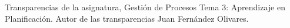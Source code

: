 % 

\begin{thebibliography}{99}

\emph{}Transparencias de la asignatura, Gesti\'on de Procesos Tema 3: Aprendizaje en Planificaci\'on. Autor de las transparencias Juan Fern\'andez Olivares.

\end{thebibliography}

